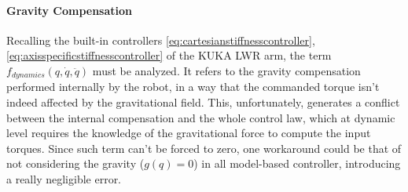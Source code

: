 \paragraph{Gravity Compensation}
Recalling the built-in controllers \eqref{eq:cartesianstiffnesscontroller},\eqref{eq:axisspecificstiffnesscontroller} of the KUKA LWR arm, the term $f_{dynamics}(q,\dot{q},\ddot{q})$ must be analyzed. It refers to the gravity compensation performed internally by the robot, in a way that the commanded torque isn't indeed affected by the gravitational field. This, unfortunately, generates a conflict between the internal compensation and the whole control law, which at dynamic level requires the knowledge of the gravitational force to compute the input torques. Since such term can't be forced to zero, one workaround could be that of not considering the gravity ($g(q)=0$) in all model-based controller, introducing a really negligible error.
